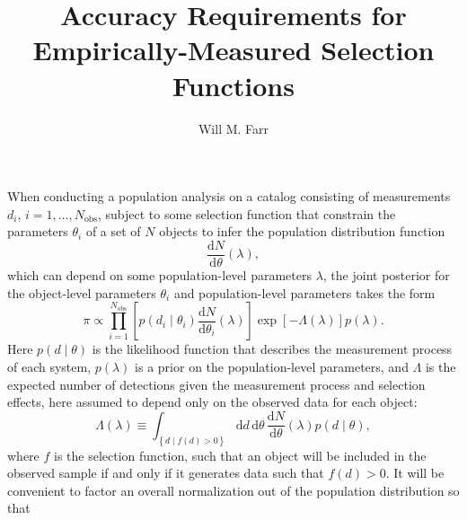 \documentclass[modern]{aastex62}
\newcommand{\dd}{\mathrm{d}}
\newcommand{\diff}[2]{\frac{\dd #1}{\dd #2}}
\newcommand{\Nobs}{N_\mathrm{obs}}
\begin{document}
\title{Accuracy Requirements for Empirically-Measured Selection Functions}

\author[0000-0003-1540-8562]{Will M. Farr}

\maketitle

When conducting a population analysis on a catalog consisting of measurements
$d_i$, $i = 1, \ldots, \Nobs$, subject to some selection function that constrain
the parameters $\theta_i$ of a set of $N$ objects to infer the population
distribution function
%
\begin{equation}
  \diff{N}{\theta}\left( \lambda \right),
\end{equation}
%
which can depend on some population-level parameters $\lambda$, the joint
posterior for the object-level parameters $\theta_i$ and population-level
parameters takes the form \citep{Loredo2004,Mandel2018}
%
\begin{equation}
  \label{eq:posterior}
\pi \propto \prod_{i=1}^{\Nobs} \left[ p\left( d_i \mid \theta_i \right) \diff{N}{\theta_i}\left( \lambda \right) \right] \exp\left[ - \Lambda\left( \lambda \right) \right] p\left( \lambda \right).
\end{equation}
%
Here $p\left( d \mid \theta\right)$ is the likelihood function that describes
the measurement process of each system, $p\left( \lambda \right)$ is a prior on
the population-level parameters, and $\Lambda$ is the expected number of
detections given the measurement process and selection effects, here assumed to
depend only on the observed data for each object:
%
\begin{equation}
  \label{eq:selection-integral-unnorm}
  \Lambda\left( \lambda \right) \equiv \int_{\left\{ d \mid f(d) > 0 \right\}} \dd d \, \dd \theta \, \diff{N}{\theta}\left( \lambda \right) p\left( d \mid \theta \right),
\end{equation}
%
where $f$ is the selection function, such that an object will be included in the
observed sample if and only if it generates data such that $f(d) > 0$.  It will
be convenient to factor an overall normalization out of the population
distribution so that
%
\end{document}
